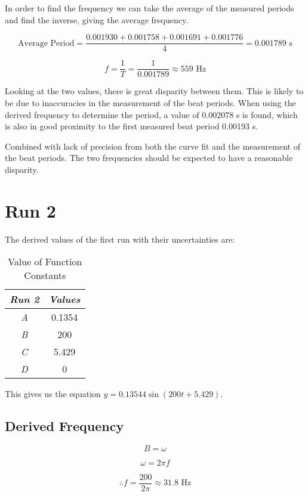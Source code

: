 		{In order to find the frequency we can take the average of the measured periods and find the inverse, giving the average frequency.}
		
			$$\text{Average Period} = \frac{0.001930 + 0.001758 + 0.001691 + 0.001776}{4} = 0.001789\text{ s}$$
			
			$$f = \frac{1}{T} = \frac{1}{0.001789} \approx 559 \text{ Hz}$$
			
		{Looking at the two values, there is great disparity between them. This is likely to be due to inaccuracies in the measurement of the beat periods. When using the derived frequency to determine the period, a value of  0.002078 s is found, which is also in good proximity to the first measured beat period 0.00193 s.}
		
		{Combined with lack of precision from both the curve fit and the measurement of the beat periods. The two frequencies should be expected to have a reasonable disparity.}
		
\section{{Run 2}}
	
	{The derived values of the first run with their uncertainties are:}
	
	\begin{table}[H]
    \centering
    \begin{tabular}{|c|c|}
    \hline\hline
        \textit{Run 2} & \textit{Values} \\ \hline
        \textit{A} & 0.1354 \\ \hline
        \textit{B} & 200 \\ \hline
        \textit{C} & 5.429 \\ \hline
        \textit{D} & 0 \\ \hline\hline
    \end{tabular}
    \caption{Value of Function Constants}
\end{table}

	{This gives us the equation $y=0.13544\sin\left(200t+5.429\right)$.}
	
	\subsection{{Derived Frequency}}
	
		$$B = \omega$$
		
		$$\omega = 2\pi f$$
		
		$$\therefore f = \frac{200}{2\pi} \approx 31.8\text{ Hz}$$	
	
